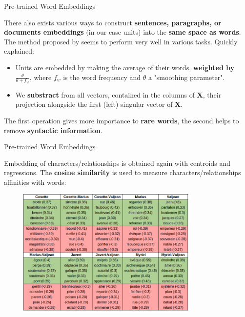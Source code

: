 \documentclass[10pt]{beamer}
\newcommand{\imp}[1]{\textbf{\color{cyan}#1}}
\begin{document}
	\begin{frame}{Pre-trained Word Embeddings}
		
		There also exists various ways to construct \imp{sentences, paragraphs, or documents embeddings} (in our case units) into the \imp{same space as words}. \\
		\vspace{0.3cm}
		The method proposed by \cite{arora2017simple} seems to perform very well in various tasks. Quickly explained:
		
		\begin{itemize}
			\item Units are embedded by making the average of their words, \imp{weighted by $\frac{\theta}{\theta + f_w}$}, where $f_w$ is the word frequency and $\theta$ a "smoothing parameter".
			\item We \imp{substract} from all vectors, contained in the columns of $\mathbf{X}$, their projection alongside the first (left) singular vector of $\mathbf{X}$.  
		\end{itemize}
	
		The first operation gives more importance to \imp{rare words}, the second helps to remove \imp{syntactic information}.
		
	\end{frame}
	
	
	\begin{frame}{Pre-trained Word Embeddings}
		
		Embedding of characters/relationships is obtained again with centroids and regressions. The \imp{cosine similarity} is used to measure characters/relationships affinities with words:
		\begin{figure}
			\centering
			\includegraphics[width=0.8\textwidth]{img/reg_vs_word_wv.png}
		\end{figure}
		
	\end{frame}
	
\end{document}
